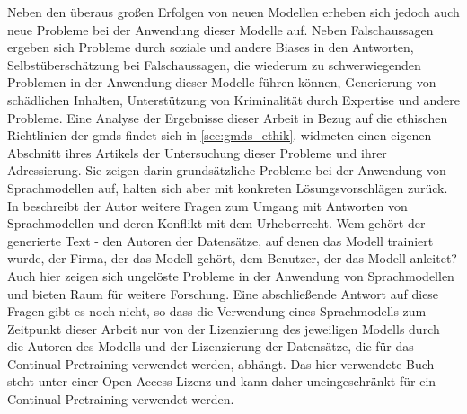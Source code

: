 Neben den überaus großen Erfolgen von neuen Modellen erheben sich jedoch auch neue Probleme bei der Anwendung dieser Modelle auf.
Neben Falschaussagen ergeben sich Probleme durch soziale und andere Biases in den Antworten, Selbstüberschätzung bei Falschaussagen, die wiederum zu schwerwiegenden Problemen in der Anwendung dieser Modelle führen können, Generierung von schädlichen Inhalten, Unterstützung von Kriminalität durch Expertise und andere Probleme. Eine Analyse der Ergebnisse dieser Arbeit in Bezug auf die ethischen Richtlinien der \ac{gmds} findet sich in \cref{sec:gmds_ethik}.
\citet{gpt4} widmeten einen eigenen Abschnitt ihres Artikels der Untersuchung dieser Probleme und ihrer Adressierung.
Sie zeigen darin grundsätzliche Probleme bei der Anwendung von Sprachmodellen auf, halten sich aber mit konkreten Lösungsvorschlägen zurück.\\

In \citet{plagiarism} beschreibt der Autor weitere Fragen zum Umgang mit Antworten von Sprachmodellen und deren Konflikt mit dem Urheberrecht.
Wem gehört der generierte Text - den Autoren der Datensätze, auf denen das Modell trainiert wurde, der Firma, der das Modell gehört, dem Benutzer, der das Modell anleitet? 
Auch hier zeigen sich ungelöste Probleme in der Anwendung von Sprachmodellen und bieten Raum für weitere Forschung. Eine abschließende Antwort auf diese Fragen gibt es noch nicht, so dass die Verwendung eines Sprachmodells zum Zeitpunkt dieser Arbeit nur von der Lizenzierung des jeweiligen Modells durch die Autoren des Modells und der Lizenzierung der Datensätze, die für das Continual Pretraining verwendet werden, abhängt. Das hier verwendete Buch \citet{bb} steht unter einer Open-Access-Lizenz und kann daher uneingeschränkt für ein Continual Pretraining verwendet werden.\\
